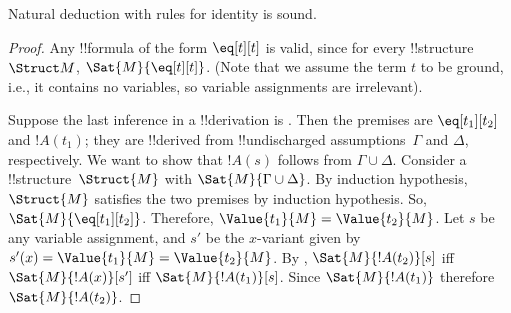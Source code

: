 \documentclass[../../../include/open-logic-section]{subfiles}
\begin{document}


\begin{prop}
Natural deduction with rules for identity is sound.
\end{prop}

\begin{proof}
Any !!{formula} of the form $\eq[t][t]$ is valid, since
for every !!{structure}~$\Struct M$, $\Sat{M}{\eq[t][t]}$. (Note that
we assume the term $t$ to be ground, i.e., it contains no variables,
so variable assignments are irrelevant).

Suppose the last inference in a !!{derivation} is \Elim{\eq}. Then the
premises are $\eq[t_1][t_2]$ and $!A(t_1)$; they are !!{derive}d from
!!{undischarged} assumptions~$\Gamma$ and $\Delta$, respectively.  We
want to show that $!A(s)$ follows from $\Gamma \cup \Delta$.  Consider
a !!{structure}~$\Struct{M}$ with $\Sat{M}{\Gamma \cup \Delta}$. By induction
hypothesis, $\Struct{M}$ satisfies the two premises by induction
hypothesis. So, $\Sat{M}{\eq[t_1][t_2]}$. Therefore, $\Value{t_1}{M} =
\Value{t_2}{M}$. Let $s$ be any variable assignment, and $s'$ be the
$x$-variant given by $s'(x) = \Value{t_1}{M} = \Value {t_2}{M}$. By
, $\Sat{M}{!A(t_2)}[s]$ iff
$\Sat{M}{!A(x)}[s']$ iff $\Sat{M}{!A(t_1)}[s]$. Since $\Sat{M}
      {!A(t_1)}$ therefore $\Sat{M}{!A(t_2)}$.
\end{proof}
\end{document}
